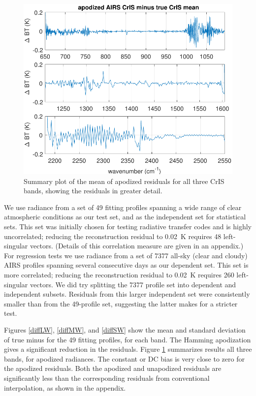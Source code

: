 \documentclass[journal]{IEEEtran}
\begin{document}
\begin{figure} %
  \centering
  \includegraphics[width=\linewidth]{figures/a2cris_diff_all.pdf}
  \caption{Summary plot of the mean of apodized residuals for all
    three CrIS bands, showing the residuals in greater detail.}
  \label{meanAll}
\end{figure}

We use radiance from a set of 49 fitting profiles spanning a wide
range of clear atmospheric conditions as our test set, and as the
independent set for statistical sets.  This set was initially chosen
for testing radiative transfer codes \cite{sarta1,sarta2} and is
highly uncorrelated; reducing the reconstruction residual to 0.02~K
requires 48 left-singular vectors.  (Details of this correlation
measure are given in an appendix.)  For regression tests we use
radiance from a set of 7377 all-sky (clear and cloudy) AIRS profiles
spanning several consecutive days as our dependent set.  This set is
more correlated; reducing the reconstruction residual to 0.02~K
requires 260 left-singular vectors.  We did try splitting the 7377
profile set into dependent and independent subsets.  Residuals from
this larger independent set were consistently smaller than from the
49-profile set, suggesting the latter makes for a stricter test.

Figures \ref{diffLW}, \ref{diffMW}, and \ref{diffSW} show the mean
and standard deviation of true {\cris} minus {\airs} {\cris} for the
49 fitting profiles, for each {\cris} band.  The Hamming apodization
gives a significant reduction in the residuals.  Figure
\ref{meanAll} summarizes results all three bands, for apodized
radiances.  The constant or DC bias is very close to zero for the
apodized residuals.  Both the apodized and unapodized residuals are
significantly less than the corresponding residuals from
conventional interpolation, as shown in the appendix.
\end{document}
